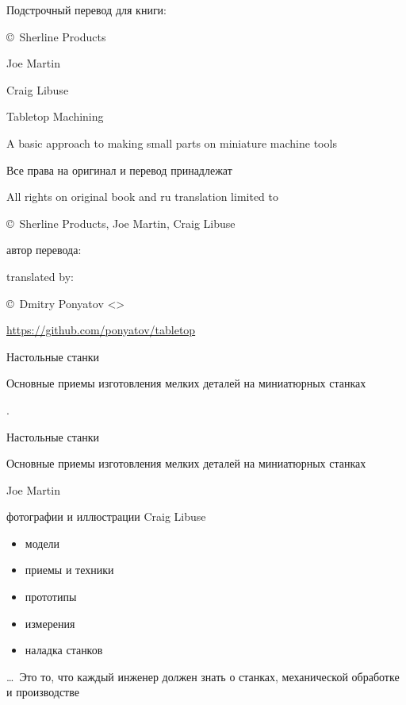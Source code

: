 \begin{titlepage}

Подстрочный перевод для книги:
\bigskip

{\Large \copyright\ Sherline Products}

{\Large Joe Martin}

{\Large Craig Libuse}

\begin{centering}

\bigskip
{\Huge Tabletop Machining}

\bigskip
{\Large A basic approach to making small parts on miniature machine tools}

\end{centering}

\bigskip
Все права на оригинал и перевод принадлежат

All rights on original book and ru translation limited to

\copyright\ Sherline Products, Joe Martin, Craig Libuse

\bigskip
автор перевода:

translated by:

\copyright\ Dmitry Ponyatov <>

\bigskip
\url{https://github.com/ponyatov/tabletop}

\bigskip
\begin{centering}

\bigskip
{\Huge Настольные станки}

\bigskip
{\Large Основные приемы изготовления мелких деталей на миниатюрных станках}

\end{centering}

\end{titlepage}

\begin{titlepage}

.
\vspace{1cm}

\begin{centering}

\bigskip
{\Huge Настольные станки}

\bigskip
{\Large Основные приемы изготовления мелких деталей на миниатюрных станках}

\end{centering}

{\Large
\bigskip
Joe Martin

\bigskip
фотографии и иллюстрации Craig Libuse
}

\bigskip
\begin{itemize}
  \item модели
  \item приемы и техники
  \item прототипы
  \item измерения
  \item наладка станков
\end{itemize}

\bigskip
\ldots\ Это то, что каждый инженер должен знать о станках, механической
обработке и производстве

\end{titlepage}
